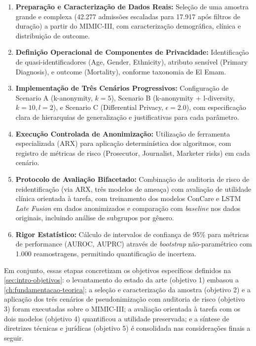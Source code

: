 \begin{enumerate}
    \item \textbf{Preparação e Caracterização de Dados Reais:} Seleção de uma amostra grande e complexa (42.277 admissões escaladas para 17.917 após filtros de duração) a partir do MIMIC-III, com caracterização demográfica, clínica e distribuição de outcome.
    
    \item \textbf{Definição Operacional de Componentes de Privacidade:} Identificação de quasi-identificadores (Age, Gender, Ethnicity), atributo sensível (Primary Diagnosis), e outcome (Mortality), conforme taxonomia de El Emam.
    
    \item \textbf{Implementação de Três Cenários Progressivos:} Configuração de Scenario A (k-anonymity, $k=5$), Scenario B (k-anonymity + l-diversity, $k=10, l=2$), e Scenario C (Differential Privacy, $\epsilon=2.0$), com especificação clara de hierarquias de generalização e justificativas para cada parâmetro.
    
    \item \textbf{Execução Controlada de Anonimização:} Utilização de ferramenta especializada (ARX) para aplicação determinística dos algoritmos, com registro de métricas de risco (Prosecutor, Journalist, Marketer risks) em cada cenário.
    
    \item \textbf{Protocolo de Avaliação Bifacetado:} Combinação de auditoria de risco de reidentificação (via ARX, três modelos de ameaça) com avaliação de utilidade clínica orientada à tarefa, com treinamento dos modelos ConCare e LSTM \textit{Late Fusion} em dados anonimizados e comparação com \textit{baseline} nos dados originais, incluindo análise de subgrupos por gênero.
    
    \item \textbf{Rigor Estatístico:} Cálculo de intervalos de confiança de 95\% para métricas de performance (AUROC, AUPRC) através de \textit{bootstrap} não-paramétrico com 1.000 reamostragens, permitindo quantificação de incerteza.
\end{enumerate}

Em conjunto, essas etapas concretizam os objetivos específicos definidos na \autoref{sec:intro-objetivos}: o levantamento do estado da arte (objetivo 1) embasou a \autoref{ch:fundamentacao-teorica}; a seleção e caracterização da amostra (objetivo 2) e a aplicação dos três cenários de pseudonimização com auditoria de risco (objetivo 3) foram executadas sobre o MIMIC-III; a avaliação orientada à tarefa com os dois modelos (objetivo 4) quantificou a utilidade preservada; e a síntese de diretrizes técnicas e jurídicas (objetivo 5) é consolidada nas considerações finais a seguir.

